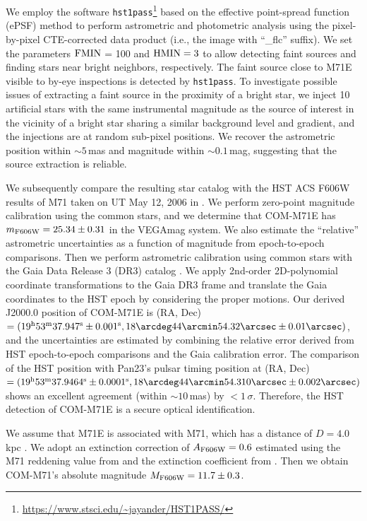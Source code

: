 \documentclass[twocolumn]{aastex631}
\begin{document}
We employ the software \texttt{hst1pass}\footnote{\url{https://www.stsci.edu/~jayander/HST1PASS/}} \citep{2022AAS...24020601A} based on the effective point-spread function (ePSF) method \citep{ePSF} to perform astrometric and photometric analysis using the pixel-by-pixel CTE-corrected data product (i.e., the image with ``\_flc'' suffix).  We set the parameters ${\rm FMIN}$ = 100 and $\rm HMIN = 3$ to allow detecting faint sources and finding stars near bright neighbors, respectively. The faint source close to M71E visible to by-eye inspections is detected by \texttt{hst1pass}. To investigate possible issues of extracting a faint source in the proximity of a bright star, we inject 10 artificial stars with the same instrumental magnitude as the source of interest in the vicinity of a bright star sharing a similar background level and gradient, and the injections are at random sub-pixel positions. We recover the astrometric position within $\sim5$\,mas and magnitude within $\sim0.1$\,mag, suggesting that the source extraction is reliable.   

We subsequently compare the resulting star catalog with the HST ACS F606W results of M71 taken on UT May 12, 2006 in \citet{2007AJ....133.1658S}. We perform zero-point magnitude calibration using the common stars, and we determine that COM-M71E has $m_{\rm F606W} = 25.34\pm0.31$ in the VEGAmag system. We also estimate the ``relative'' astrometric uncertainties as a function of magnitude from epoch-to-epoch comparisons. Then we perform astrometric calibration using common stars with the Gaia Data Release 3 (DR3) catalog \citep{2022arXiv220800211G}. We apply 2nd-order 2D-polynomial coordinate transformations to the Gaia DR3 frame and translate the Gaia coordinates to the HST epoch by considering the proper motions. Our derived J2000.0 position of COM-M71E is (RA, Dec) $=(19^{\rm h}53^{\rm m}37.947^{\rm s}\pm0.001^{\rm s}, 18\arcdeg44\arcmin54.32\arcsec \pm 0.01\arcsec)$, and the uncertainties are estimated by combining the relative error derived from HST epoch-to-epoch comparisons and the Gaia calibration error. The comparison of the HST position with Pan23's pulsar timing position at (RA, Dec) $= (19^{\rm h}53^{\rm m}37.9464^{\rm s}\pm0.0001^{\rm s}, 18\arcdeg44\arcmin54.310\arcsec\pm0.002\arcsec)$ shows an excellent agreement (within $\sim10$\,mas) by $<1\,\sigma$. Therefore, the HST detection of COM-M71E is a secure optical identification.

We assume that M71E is associated with M71, which has a distance of $D = 4.0$\,kpc \citep{GCdist}. We adopt an extinction correction of $A_{\rm F606W} = 0.6$ estimated using the M71 reddening value from \citet{Dotter2010} and the extinction coefficient from \citet{2005PASP..117.1049S}. Then we obtain COM-M71's absolute magnitude $M_{\rm F606W} = 11.7\pm0.3$.
\end{document}
